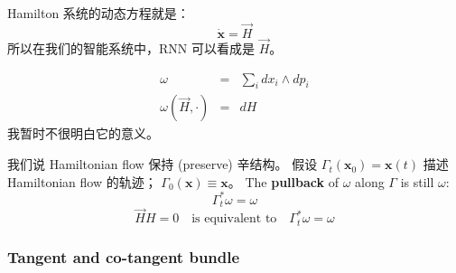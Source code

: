 \documentclass[orivec]{llncs}
\newcommand{\emp}[1]{\textbf{\textcolor{Cerulean}{#1}}}
\newcommand{\vect}[1]{\boldsymbol{#1}}
\begin{document}
Hamilton 系统的动态方程就是：
\begin{equation}
\dot{\vect{x}} = \vec{H}
\end{equation}
所以在我们的智能系统中，RNN 可以看成是 $\vec{H}$。

\begin{eqnarray}
\omega & = & \sum_i dx_i \wedge dp_i \\
\omega(\vec{H}, \cdot) & = & dH
\end{eqnarray}
我暂时不很明白它的意义。

我们说 Hamiltonian flow 保持 (preserve) 辛结构。 假设 $\Gamma_t(\vect{x}_0) = \vect{x}(t)$ 描述 Hamiltonian flow 的轨迹； $\Gamma_0(\vect{x}) \equiv \vect{x}$。 The \emp{pullback} of $\omega$ along $\Gamma$ is still $\omega$:
\begin{equation}
\Gamma^*_t \omega = \omega
\end{equation}
\begin{equation}
\vec{H} H = 0 \quad \mbox{is equivalent to} \quad \Gamma^*_t \omega = \omega
\end{equation}

\subsubsection{Tangent and co-tangent bundle}
\end{document}

